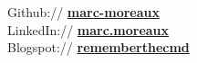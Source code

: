 \documentclass[letterpaper]{deedy-resume} %
\begin{document}
\begin{minipage}[t]{0.33\textwidth}
Github:// \href{https://github.com/marc-moreaux}{\bf marc-moreaux} \\
LinkedIn:// \href{https://fr.linkedin.com/pub/marc-moreaux/4b/760/98b}{\bf marc.moreaux} \\
Blogspot:// \href{http://rememberthecmd.blogspot.fr/}{\bf rememberthecmd}

\sectionspace %



\end{minipage} %
\hfill
%
%
\end{document}
